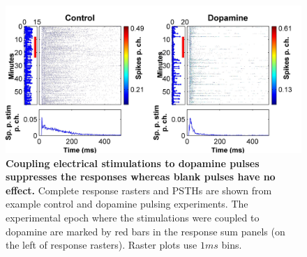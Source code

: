    \begin{figure}[h]
       \centering
       \includegraphics[width=15cm]{chapter6/figures/pulsingRasterExample/experimentRasterExample.jpg}
       \caption[Example response rasters from the dopamine pulsing experiment]{\textbf{Coupling electrical stimulations to dopamine pulses suppresses the responses whereas blank pulses have no effect.} Complete response rasters and PSTHs are shown from example control and dopamine pulsing experiments. The experimental epoch where the stimulations were coupled to dopamine are marked by red bars in the response sum panels (on the left of response rasters). Raster plots use \(1ms\) bins.}
       \label{fig:pulses:pulsingExample}

   \end{figure}
